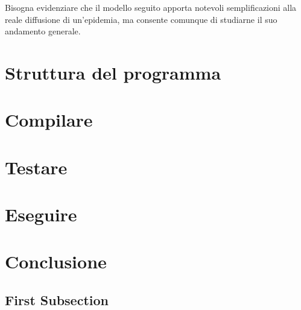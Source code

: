 \documentclass[11pt, a4paper]{article} %
\begin{document}
Bisogna evidenziare che il modello seguito apporta notevoli semplificazioni alla reale diffusione di un'epidemia, ma consente comunque di studiarne il suo andamento generale.

\section{Struttura del programma}

\section{Compilare}
\section{Testare}  %
\section{Eseguire} %
\section{Conclusione}

\subsection{First Subsection} %
\end{document}
